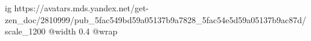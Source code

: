  
 
 
 
 


\ifcmt
  ig https://avatars.mds.yandex.net/get-zen_doc/2810999/pub_5fac549bd59a05137b9a7828_5fac54e5d59a05137b9ac87d/scale_1200
  @width 0.4
  @wrap 
\fi
